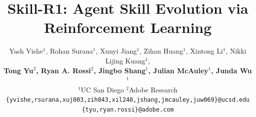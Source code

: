 \documentclass{article} %
\title{Skill-R1: Agent Skill Evolution via Reinforcement Learning}
\author{
Yash Vishe$^{1}$, Rohan Surana$^{1}$, Xunyi Jiang$^{1}$, Zihan Huang$^{1}$, Xintong Li$^{1}$, Nikki Lijing Kuang$^{1}$, \\
\textbf{Tong Yu$^{2}$, Ryan A. Rossi$^{2}$, Jingbo Shang$^{1}$, Julian McAuley$^{1}$, Junda Wu$^{1}$}
\\
$^{1}$UC San Diego \quad
$^{2}$Adobe Research \\
\texttt{\{yvishe,rsurana,xuj003,zih043,xil240,jshang,jmcauley,juw069\}@ucsd.edu} \\
\texttt{\{tyu,ryan.rossi\}@adobe.com} \\
}
\theoremstyle{definition}
\theoremstyle{remark}
\begin{document}
\ifcolmsubmission
\linenumbers
\fi

\maketitle














\appendix

\end{document}
